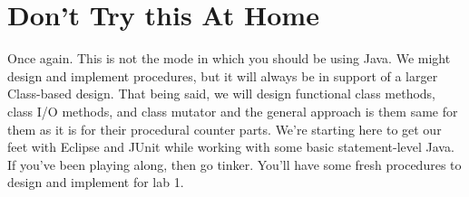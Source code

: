 \documentclass[]{tufte-handout}
\begin{document}
\section{Don't Try this At Home}

Once again. This is not the mode in which you should be using Java. We might design and implement procedures, but it will always be in support of a larger Class-based design. That being said, we will design functional class methods, class I/O methods, and class mutator and the general approach is them same for them as it is for their procedural counter parts. We're starting here to get our feet with Eclipse and JUnit while working with some basic statement-level Java. If you've been playing along, then go tinker. You'll have some fresh procedures to design and implement for lab 1.
\end{document}
